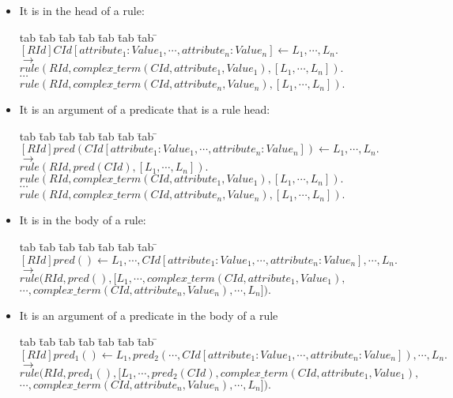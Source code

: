 \documentclass{article}
\newenvironment{program}{\begin{tabbing}
   tab \= tab \= tab \= tab \= tab \= tab \= tab \= \kill}{\end{tabbing}}
\newcommand{\rewrite}{\longrightarrow}
\begin{document}
\begin{itemize}
\item It is in the head of a rule:
\begin{program}
$[RId]CId[attribute_1:Value_1, \cdots, attribute_n:Value_n] \leftarrow L_1, \cdots, L_n.$ \\
\> $\rewrite$ \\
\> \> $rule(RId, complex\_term(CId, attribute_1, Value_1), [L_1, \cdots, L_n]).$ \\
\> \> $\cdots$ \\
\> \> $rule(RId, complex\_term(CId, attribute_n, Value_n), [L_1, \cdots, L_n]).$
\end{program}

\item It is an argument of a predicate that is a rule head:
\begin{program}
$[RId]pred(CId[attribute_1:Value_1, \cdots, attribute_n:Value_n]) \leftarrow L_1, \cdots, L_n.$\\
\> $\rewrite$ \\
\> \> $rule(RId, pred(CId), [L_1, \cdots, L_n]).$ \\
\> \> $rule(RId, complex\_term(CId, attribute_1, Value_1), [L_1, \cdots, L_n]).$ \\
\> \> $\cdots$ \\
\> \> $rule(RId, complex\_term(CId, attribute_n, Value_n), [L_1, \cdots, L_n]).$
\end{program}

\item It is in the body of a rule:
\begin{program}
$[RId]pred() \leftarrow L_1, \cdots, CId[attribute_1:Value_1, \cdots, attribute_n:Value_n], \cdots, L_n.$\\
\> $\rewrite$ \\
\> \> $rule(RId, pred(), [L_1, \cdots, complex\_term(CId, attribute_1, Value_1),$\\
\> \> $\cdots, complex\_term(CId, attribute_n, Value_n), \cdots, L_n]).$
\end{program}

\item It is an argument of a predicate in the body of a rule
\begin{program}
$[RId]pred_1() \leftarrow L_1, pred_2(\cdots, CId[attribute_1:Value_1, \cdots, attribute_n:Value_n]), \cdots, L_n.$\\
\> $\rewrite$ \\
\> \> $rule(RId, pred_1(), [L_1, \cdots, pred_2(CId), complex\_term(CId, attribute_1, Value_1),$\\
\> \> $\cdots, complex\_term(CId, attribute_n, Value_n), \cdots, L_n]).$
\end{program}

\end{itemize}
\end{document}
